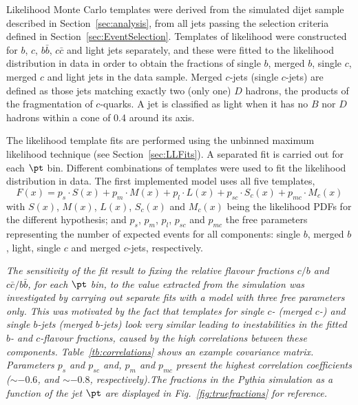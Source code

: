 Likelihood Monte Carlo templates were derived from the simulated dijet sample described in Section~\ref{sec:analysis}, from all jets passing the selection criteria defined in Section~\ref{sec:EventSelection}. Templates of likelihood were constructed for $b$, $c$, $b\bar{b}$, $c\bar{c}$ and light jets separately, and these were fitted to the likelihood distribution in data in order to obtain the fractions of single $b$, merged $b$, single $c$, merged $c$ and light jets in the data sample. Merged $c$-jets (single $c$-jets) are defined as those jets matching exactly two (only one) $D$ hadrons, the products of the fragmentation of $c$-quarks. A jet is classified as light when it has no $B$ nor $D$ hadrons within a cone of 0.4 around its axis.

The likelihood template fits are performed using the unbinned maximum likelihood technique (see Section~\ref{sec:LLFits}). A separated fit is carried out for each $\pt$ bin. Different combinations of templates were used to fit the likelihood distribution in data. The first implemented model uses all five templates,
%
\begin{equation}
F(x) = p_s \cdot S(x) + p_m \cdot M(x) + p_l \cdot L(x) + p_{sc} \cdot S_c(x) + p_{mc} \cdot M_c(x)
\end{equation}
%
with $S(x)$, $M(x)$, $L(x)$, $S_c(x)$ and $M_c(x)$ being the likelihood PDFs for the different hypothesis; and $p_s$, $p_m$, $p_l$, $p_{sc}$ and $p_{mc}$ the free parameters representing the number of expected events for all components: single $b$, merged $b$, light, single $c$ and merged $c$-jets, respectively.  %


\emph{The sensitivity of the fit result to fixing the relative flavour fractions  $c/b$ and $c\bar{c}/b\bar{b}$, for each $\pt$ bin, to the value extracted from the simulation was investigated by carrying out separate fits with a model with three free parameters only. This was motivated by the fact that templates for single $c$- (merged $c$-)  and single $b$-jets (merged $b$-jets) look very similar leading to inestabilities in the fitted $b$- and $c$-flavour fractions, caused by the high correlations between these components.  Table~\ref{tb:correlations} shows an example covariance matrix.  Parameters $p_s$ and $p_{sc}$ and, $p_m$ and $p_{mc}$ present the highest correlation coefficients ($\sim -0.6$, and $\sim -0.8$, respectively).The fractions in the {\sc Pythia} simulation  as a function of the jet $\pt$ are displayed in Fig.~\ref{fig:truefractions} for reference.}


